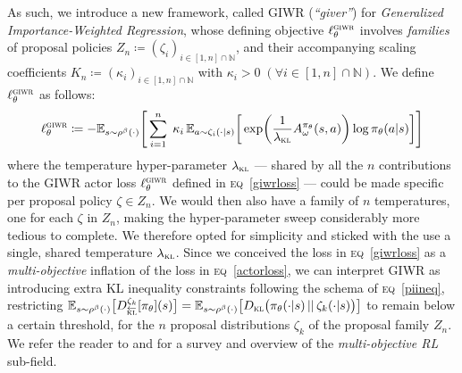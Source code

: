 As such, we introduce a new framework, called GIWR (\textit{``giver''}) for
\textit{Generalized Importance-Weighted Regression}, whose defining objective
$\ell^\textsc{giwr}_\theta$
involves \emph{families} of proposal policies $Z_n \coloneqq (\zeta_i)_{i \in [1,n] \cap \mathbb{N}}$,
and their accompanying scaling coefficients $K_n \coloneqq (\kappa_i)_{i \in [1,n] \cap \mathbb{N}}$
with $\kappa_i > 0 \; (\forall i \in [1,n] \cap \mathbb{N})$.
We define $\ell^\textsc{giwr}_\theta$ as follows:
\begin{align}
  \ell^\textsc{giwr}_\theta \coloneqq -
  \mathbb{E}_{s \sim \rho^\beta(\cdot)}
  \Bigg[
  \sum^{n}_{i=1}
  \; \kappa_i \,
  \mathbb{E}_{a \sim \zeta_i(\cdot | s)}
  \bigg[
  \exp (\frac{1}{\lambda_\textsc{kl}} A^{\pi_\theta}_\omega(s,a)) \log \pi_\theta(a | s)
  \bigg]
  \Bigg]
  \label{giwrloss}
\end{align}
where the temperature hyper-parameter $\lambda_\textsc{kl}$ --- shared by all the $n$ contributions
to the GIWR actor loss $\ell^\textsc{giwr}_\theta$ defined in \textsc{eq}~\ref{giwrloss} ---
could be made specific per proposal policy $\zeta \in Z_n$.
We would then also have a family of $n$ temperatures, one for each $\zeta$ in $Z_n$,
making the hyper-parameter sweep considerably more tedious to complete.
We therefore opted for simplicity and sticked with the use a single, shared temperature $\lambda_\textsc{kl}$.
Since we conceived the loss in \textsc{eq}~\ref{giwrloss} as a \emph{multi-objective}
inflation of the loss in \textsc{eq}~\ref{actorloss},
we can interpret GIWR as introducing extra KL inequality constraints
following the schema of \textsc{eq}~\ref{piineq}, restricting
$\mathbb{E}_{s \sim \rho^\beta(\cdot)}\big[
D^{\zeta_k}_{\overleftarrow{\textsc{kl}}}[\pi_\theta](s)
\big]
=
\mathbb{E}_{s \sim \rho^\beta(\cdot)}\big[
D_{\textsc{kl}}\big(\pi_\theta (\cdot | s) \, || \, \zeta_k (\cdot | s)\big)
\big]$
to remain below a certain threshold,
for the $n$ proposal distributions $\zeta_k$
of the proposal family $Z_n$.
We refer the reader to \cite{Roijers2014-rt}
and \cite{Mossalam2016-aj}
for a survey and overview of the \textit{multi-objective RL} sub-field.

